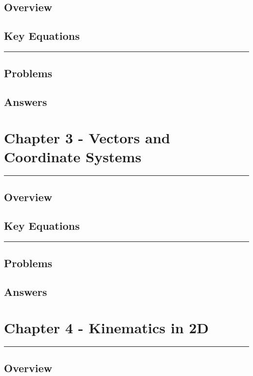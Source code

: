 \documentclass[a4paper,12pt]{article}
\begin{document}
\subsection*{Overview}

\subsection*{Key Equations}

\begin{center}
  \rule{6cm}{0.5pt}
\end{center}
\subsection*{Problems}
\subsection*{Answers}


\pagebreak
\section*{Chapter 3 - Vectors and Coordinate Systems}
\rule{\linewidth}{1pt}
\subsection*{Overview}
\subsection*{Key Equations}

\begin{center}
  \rule{6cm}{0.5pt}
\end{center}
\subsection*{Problems}
\subsection*{Answers}

\pagebreak
\section*{Chapter 4 - Kinematics in 2D}
\rule{\linewidth}{1pt}
\subsection*{Overview}
\end{document}
